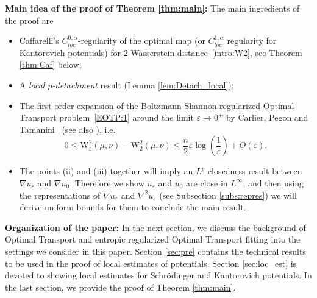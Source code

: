 \documentclass[reqno,12pt]{article}
\begin{document}
\vspace{10pt}

\noindent
\textbf{Main idea of the proof of Theorem \ref{thm:main}:} The main ingredients of the proof are 
\begin{itemize}
    \item[(i)] Caffarelli's $C_{loc}^{0,\alpha}$-regularity of the optimal map (or $C_{loc}^{1,\alpha}$ regularity for Kantorovich potentials) for $2$-Wasserstein distance~\eqref{intro:W2}, see Theorem \ref{thm:Caf} below;
    \item[(ii)] A \textit{local $p$-detachment} result (Lemma \ref{lem:Detach_local});
    \item[(iii)] The first-order expansion of the Boltzmann-Shannon
regularized Optimal Transport problem~\eqref{EOTP:1} around the limit $\varepsilon\to 0^+$ by Carlier, Pegon and Tamanini~\cite{CPT23} (see also \cite{CarDuvPeySch17}), i.e. 
\[
        0 \leqslant \text{W}^2_{\varepsilon}(\mu,\nu)-\text{W}^2_2(\mu,\nu) 
        \leqslant
        \frac{n}{2}\varepsilon\log\left( \frac{1}{\varepsilon} \right) + O(\varepsilon).
\]

\item[(iv)] The points (ii) and (iii) together will imply an $L^p$-closedness result between $\nabla u_{\varepsilon}$ and $ \nabla u_0$. Therefore we show $u_{\varepsilon}$ and $u_0$ are close in $L^{\infty}$, and then using the representations of $\nabla u_{\varepsilon}$ and $\nabla^2 u_{\varepsilon}$ (see Subsection \ref{subs:repres}) we will derive uniform bounds for them to conclude the main result.
\end{itemize}


\vspace{2mm}

\noindent
\textbf{Organization of the paper:} In the next section, we discuss the background of Optimal Transport and entropic regularized Optimal Transport fitting into the settings we consider in this paper. Section \ref{sec:pre} contains the technical results to be used in the proof of local estimates of potentials. Section \ref{sec:loc_est} is devoted to showing local estimates for Schr\"odinger and Kantorovich potentials. In the last section, we provide the proof of Theorem \ref{thm:main}.


\end{document}
